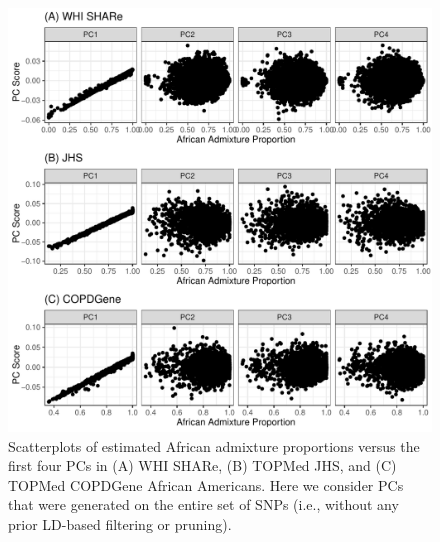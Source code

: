 \documentclass[12pt]{article}
\begin{document}
\begin{figure}
\center
\includegraphics[width=\textwidth]{figs/pcs_vs_global/pcs_vs_global}
\caption[Scatterplots of estimated admixture proportions versus the first four PCs, without LD-based filtering or pruning.]{Scatterplots of estimated African admixture proportions versus the first four PCs in (A) WHI SHARe, (B) TOPMed JHS, and (C) TOPMed COPDGene African Americans. Here we consider PCs that were generated on the entire set of SNPs (i.e., without any prior LD-based filtering or pruning).}
\label{fig:pcsvsglob}
\end{figure}
\end{document}
